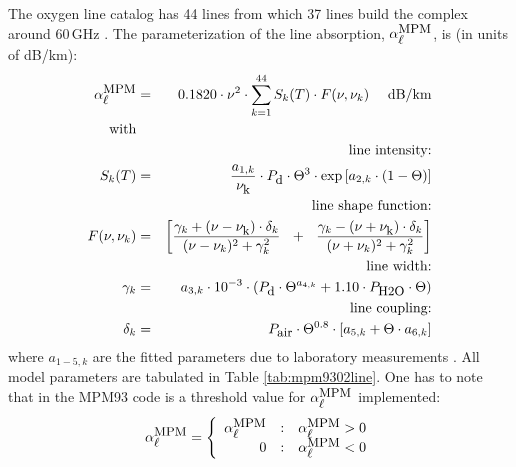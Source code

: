 \label{levele:mpm93_o2lines}
The oxygen line catalog has 44 lines from which 37 lines build the 
complex around 60\,GHz \citep{liebeetal:93}. The parameterization 
of the line absorption, $\alpha^{\mbox{\rm \small MPM}}_{\mbox{\small $\ell$}}$, is (in units of dB/km):
\begin{eqnarray}
  \alphampml & = & 0.1820 \cdot \nu^2 \cdot  
                   \sum_{k=1}^{44}{S_k(T) \cdot F(\nu,\nu_k)}~~~~\mbox{dB/km}\\
%
 \mbox{with} &   &\nonumber\\
%
 & & \mbox{line intensity:} \nonumber\\
      \label{eq:MPM93:O2_inten}
      S_k(T) & = & \frac{a_{1,k}}{\nuk} \cdot \pda \cdot \Theta^3 \cdot 
                   \exp{[a_{2,k} \cdot (1-\Theta)]}\\
 & & \mbox{line shape function:}  \nonumber\\
 F(\nu,\nu_k) & = & \left[\frac{\gamma_k+(\nu-\nuk)\cdot \delta_k}
                               {(\nu-\nu_k)^2+\gamma_k^2}~~+~~
                          \frac{\gamma_k-(\nu+\nuk)\cdot \delta_k}
                               {(\nu+\nu_k)^2+\gamma_k^2}\right] \nonumber\\
 & & \mbox{line width:}  \nonumber\\
     \label{eq:MPM93:O2_gamma}
     \gamma_k & = & a_{3,k} \cdot 10^{-3} \cdot 
                 \left( \pda  \cdot \Theta^{a_{4,k}} + 
                        1.10 \cdot \phzo \cdot \Theta \right)\\
& &  \mbox{line coupling:}  \nonumber\\
     \label{eq:MPM93:O2_coupling}
     \delta_k & = & \pdair \cdot \Theta^{0.8} \cdot 
                   \left[ a_{5,k} + \Theta \cdot a_{6,k} \right]\nonumber
\nonumber
\end{eqnarray}
%
where $a_{1-5,k}$ are the fitted parameters due to laboratory measurements 
\cite{liebeetal:92}. All model parameters are tabulated in 
Table \ref{tab:mpm9302line}. One has to note that in the MPM93 code is a 
threshold value for $\alpha^{\mbox{\rm \small MPM}}_{\mbox{\small $\ell$}}$ implemented:
\begin{equation}
 \label{eq:mpm93O2limit}
  \alphampml = 
   \left \{ \begin{array}{r@{\quad:\quad}l} 
    \alphampml & \alphampml > 0\\
    0          & \alphampml < 0
                       \end{array} \right.
\end{equation}
